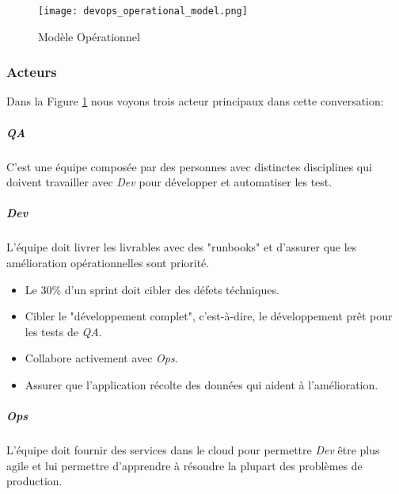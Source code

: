 \begin{figure}[!ht]
\centering
\texttt{[image: devops\_operational\_model.png]}
\caption{Modèle Opérationnel \cite{IsaacSacolick2016DrivingCulture}}
\label{devops_operational_model}
\end{figure}


\subsubsection{Acteurs}
Dans la Figure \ref{devops_operational_model} nous voyons trois acteur principaux dans cette conversation:

\subparagraph{QA}
C'est une équipe composée par des personnes avec distinctes disciplines qui doivent travailler avec \textit{Dev} pour développer et automatiser les test.
\subparagraph{Dev} L'équipe doit livrer les livrables avec des "runbooks" et d'assurer que les amélioration opérationnelles sont priorité.
\begin{itemize}
  \item Le 30\% d'un sprint doit cibler des défets téchniques.
  \item Cibler le "développement complet", c'est-à-dire, le développement prêt pour les tests de \textit{QA}.
  \item Collabore activement avec \textit{Ops}.
  \item Assurer que l'application récolte des données qui aident à l'amélioration.
\end{itemize}
\subparagraph{Ops}
L'équipe doit fournir des services dans le cloud pour permettre \textit{Dev} être plus agile et lui permettre d'apprendre à résoudre la plupart des problèmes de production.
